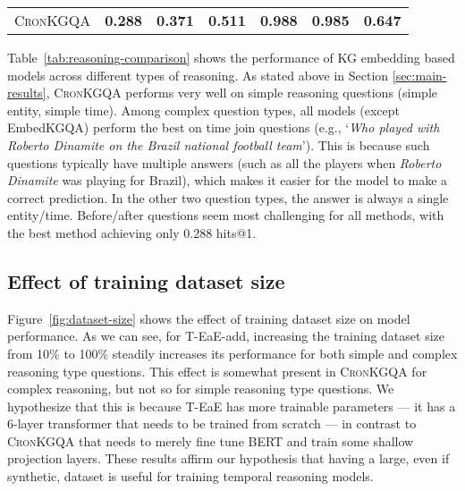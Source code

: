 \documentclass[11pt,a4paper]{article}
\newcommand{\method}{\textsc{CronKGQA}}
\begin{document}
\begin{table*}[t!]
{\begin{tabular}{l|rrrrr|r}
\method{}     & \textbf{0.288}                                                              & \textbf{0.371}                                                            & \textbf{0.511}                                                          & \textbf{0.988}                                                              & \textbf{0.985}      & \textbf{0.647}                                                    
\end{tabular}}
\caption{Hits@1 for different reasoning type questions. `Simple Entity' and `Simple Time' correspond to simple question type in Table \ref{tab:main-results} while the others correspond to complex question type. Please refer to section \ref{sec:perf_across_qn_type} for more details.}
\label{tab:reasoning-comparison}
\end{table*} 
Table~\ref{tab:reasoning-comparison} shows the performance of KG embedding based models across different types of reasoning. As stated above in Section \ref{sec:main-results}, \method{} performs very well on simple reasoning questions (simple entity, simple time). Among complex question types, all models (except EmbedKGQA) perform the best on time join questions (e.g., `\textit{Who played with Roberto Dinamite on the Brazil national football team}'). This is because such questions typically have multiple answers (such as all the players when \textit{Roberto Dinamite} was playing for Brazil), which makes it easier for the model to make a correct prediction. In the other two question types, the answer is always a single entity/time. Before/after questions seem most challenging for all methods, with the best method achieving only 0.288 hits@1.



\subsection{Effect of training dataset size}
\label{sec:training-data-size-effect}

Figure~\ref{fig:dataset-size} shows the effect of training dataset size on model performance. As we can see, for T-EaE-add, increasing the training dataset size from 10\% to 100\% steadily increases its performance for both simple and complex reasoning type questions. This effect is somewhat present in \method{} for complex reasoning, but not so for simple reasoning type questions. We hypothesize that this is because T-EaE has more trainable parameters --- it has a 6-layer transformer that needs to be trained from scratch --- in contrast to \method{} that needs to merely fine tune BERT and train some shallow projection layers. These results affirm our hypothesis that having a large, even if synthetic, dataset is useful for training temporal reasoning models.
\end{document}
